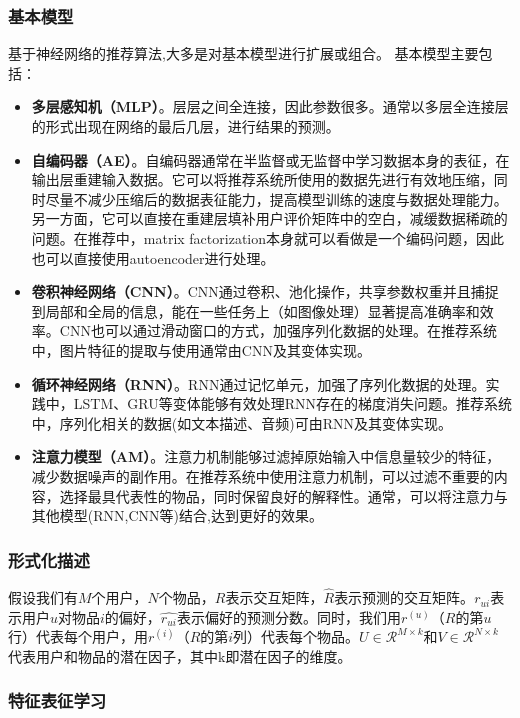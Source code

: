 \subsubsection{基本模型}
基于神经网络的推荐算法,大多是对基本模型进行扩展或组合。
基本模型主要包括：
\begin{itemize}
    \item \textbf{多层感知机（MLP）}。层层之间全连接，因此参数很多。通常以多层全连接层的形式出现在网络的最后几层，进行结果的预测。
    \item \textbf{自编码器（AE）}。自编码器通常在半监督或无监督中学习数据本身的表征，在输出层重建输入数据。它可以将推荐系统所使用的数据先进行有效地压缩，同时尽量不减少压缩后的数据表征能力，提高模型训练的速度与数据处理能力。另一方面，它可以直接在重建层填补用户评价矩阵中的空白，减缓数据稀疏的问题。在推荐中，matrix factorization本身就可以看做是一个编码问题，因此也可以直接使用autoencoder进行处理。
    \item \textbf{卷积神经网络（CNN）}。CNN通过卷积、池化操作，共享参数权重并且捕捉到局部和全局的信息，能在一些任务上（如图像处理）显著提高准确率和效率。CNN也可以通过滑动窗口的方式，加强序列化数据的处理。在推荐系统中，图片特征的提取与使用通常由CNN及其变体实现。
    \item \textbf{循环神经网络（RNN）}。RNN通过记忆单元，加强了序列化数据的处理。实践中，LSTM、GRU等变体能够有效处理RNN存在的梯度消失问题。推荐系统中，序列化相关的数据(如文本描述、音频)可由RNN及其变体实现。
    \item \textbf{注意力模型（AM）}。注意力机制能够过滤掉原始输入中信息量较少的特征，减少数据噪声的副作用。在推荐系统中使用注意力机制，可以过滤不重要的内容，选择最具代表性的物品，同时保留良好的解释性\cite{chen2017attentive}。通常，可以将注意力与其他模型(RNN,CNN等)结合,达到更好的效果。
\end{itemize}

\subsubsection{形式化描述}
假设我们有$M$个用户，$N$个物品，$R$表示交互矩阵，$\hat{R}$表示预测的交互矩阵。$r_{ui}$表示用户$u$对物品$i$的偏好，$\hat{r_{ui}}$表示偏好的预测分数。同时，我们用$r^{(u)}$（$R$的第$u$行）代表每个用户，用$r^{(i)}$（$R$的第$i$列）代表每个物品。$U \in \mathcal{R}^{M \times k}$和$V \in \mathcal{R}^{N \times k}$代表用户和物品的潜在因子，其中k即潜在因子的维度。
\subsubsection{特征表征学习}
